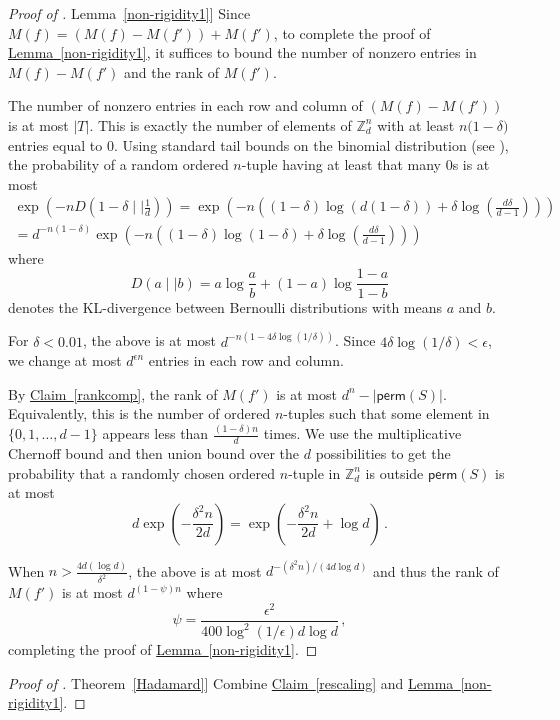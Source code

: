 \documentclass[11pt]{article}
\numberwithin{equation}{section}
\theoremstyle{definition}
\theoremstyle{plain}
\newcommand{\Z}{\mathbb Z}
\newcommand{\expref}[2]{\hyperref[#2]{#1~\ref{#2}}}
\theoremstyle{definition}
\renewcommand\Z{{\mathbb{Z}}}
\newcommand\perm{\textsf{perm}}
\begin{document}
\begin{proof}[Proof of \expref{Lemma}{non-rigidity1}] Since $M(f) = (M(f) - M(f')) + M(f')$, to complete the proof of \expref{Lemma}{non-rigidity1}, it suffices to bound the number of nonzero entries in $M(f) - M(f')$ and the rank of $M(f')$.

The number of nonzero entries in each row and column of $(M(f) - M(f'))$ is at most $|T|$.  This is exactly the number of elements of $\Z_d^n$ with at least $n\big(1- \delta \big)$ entries equal to $0$.  Using standard tail bounds on the binomial distribution (see \cite{binomial_tails}), the probability of a random ordered $n$-tuple having at least that many $0$s is at most
%
%
%
%
\begin{align*}
\exp\left(-nD\left(1-\delta \mid \mid \frac{1}{d}\right)\right) = \exp\left(-n \left( (1- \delta) \log (d(1-\delta)) + \delta \log\left(\frac{d\delta}{d-1}\right)\right)\right) \\ 
= d^{-n(1-\delta)}\exp\left(-n\left((1-\delta) \log(1-\delta) + \delta \log\left(\frac{d\delta}{d-1}\right)\right)\right)
\end{align*}
%
where %
\[
D(a \mid \mid b) = a \log \frac{a}{b} + (1-a) \log \frac{1-a}{1-b} 
\]
denotes the KL-divergence between Bernoulli distributions with means $a$ and $b$.
%
 
 For $\delta < 0.01$, the above is at most $d^{-n(1- 4\delta \log (1/\delta))}$.  Since $4\delta \log (1/\delta) < \epsilon$, we change at most $d^{ \epsilon n}$ entries in each row and column.


By \expref{Claim}{rankcomp}, the rank of $M(f')$ is at most $d^n - |\perm(S)|$.  Equivalently, this is the number of ordered $n$-tuples such that some element in $\{0,1, \dots , d-1 \}$ appears less than $ \frac{(1-\delta)n}{d}$ times.  We use the multiplicative Chernoff bound and then union bound over the $d$ possibilities to get the probability that a randomly chosen ordered $n$-tuple in $\Z_d^n$ is outside $\perm(S)$ is at most
\[
d\exp\left(-\frac{\delta^2n}{2d}\right)  = \exp\left(-\frac{\delta^2n}{2d} + \log d\right) \,.
\]

When $n > \frac{4d(\log d)}{\delta^2}$, the above is at most $d^{-(\delta^2 n)/(4 d \log d)}$ and thus the rank of $M(f')$ is at most  
$d^{(1- \psi)n}$
where 
\[
\psi = \frac{\epsilon^2 }{400 \log^2 (1/\epsilon) d \log d} \,,
\]
completing the proof of \expref{Lemma}{non-rigidity1}.
\end{proof}

\begin{proof}[Proof of \expref{Theorem}{Hadamard}]
%
%
%
Combine \expref{Claim}{rescaling} and \expref{Lemma}{non-rigidity1}. %
\end{proof}
\end{document}
